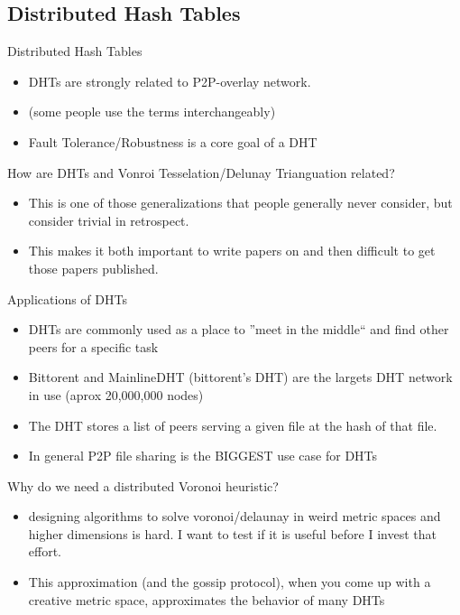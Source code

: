 \documentclass[8pt]{beamer}
\begin{document}
	
\subsection{Distributed Hash Tables}
	\begin{frame}{Distributed Hash Tables}
		\begin{itemize}
			\item DHTs are strongly related to P2P-overlay network.
			\item (some people use the terms interchangeably)
			\item Fault Tolerance/Robustness is a core goal of a DHT
		\end{itemize}
	\end{frame}
	
\begin{frame}{How are DHTs and Vonroi Tesselation/Delunay Trianguation related?}
	\begin{itemize}
		\item This is one of those generalizations that people generally never consider, but consider trivial in retrospect.
		\item This makes it both important to write papers on and then difficult to get those papers published.
	\end{itemize}
\end{frame}

	\begin{frame}{Applications of DHTs}
		\begin{itemize}
			\item DHTs are commonly used as a place to ''meet in the middle`` and find other peers for a specific task
			\item Bittorent and MainlineDHT (bittorent's DHT) are the largets DHT network in use (aprox 20,000,000 nodes)
			\item The DHT stores a list of peers serving a given file at the hash of that file.
			\item In general P2P file sharing is the BIGGEST use case for DHTs
		\end{itemize}
	\end{frame}



\begin{frame}{Why do we need a distributed Voronoi heuristic?}
	\begin{itemize}
		\item designing algorithms to solve voronoi/delaunay in weird metric spaces and higher dimensions is hard. I want to test if it is useful before I invest that effort.
		\item This approximation (and the gossip protocol), when you come up with a creative metric space, approximates the behavior of many DHTs
	\end{itemize}
	

\end{frame}
\end{document}
